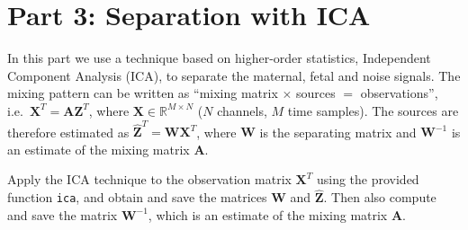 \section*{Part 3: Separation with ICA}

\begin{taskbox}
In this part we use a technique based on higher-order statistics, Independent Component Analysis (ICA), to separate the maternal, fetal and noise signals. The mixing pattern can be written as ``mixing matrix $\times$ sources $=$ observations'', i.e.\ $\mathbf{X}^{T}=\mathbf{A}\mathbf{Z}^{T}$, where $\mathbf{X}\in\mathbb{R}^{M\times N}$ ($N$ channels, $M$ time samples). The sources are therefore estimated as $\hat{\mathbf{Z}}^{T}=\mathbf{W}\mathbf{X}^{T}$, where $\mathbf{W}$ is the separating matrix and $\mathbf{W}^{-1}$ is an estimate of the mixing matrix $\mathbf{A}$.
\end{taskbox}


\begin{taskbox}
Apply the ICA technique to the observation matrix $\mathbf{X}^{T}$ using the provided function \texttt{ica}, and obtain and save the matrices $\mathbf{W}$ and $\hat{\mathbf{Z}}$. Then also compute and save the matrix $\mathbf{W}^{-1}$, which is an estimate of the mixing matrix $\mathbf{A}$.
\end{taskbox}

